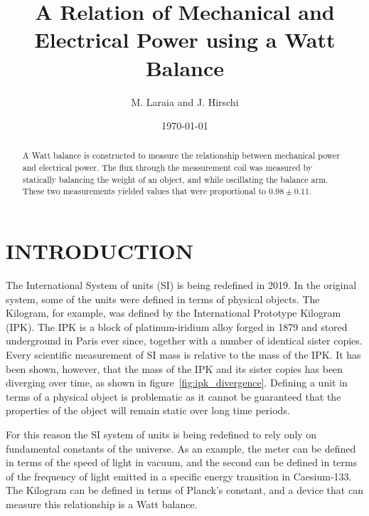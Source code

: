\documentclass[aps,prstab,reprint,12pt]{revtex4-1}
\begin{document}
\title{A Relation of Mechanical and Electrical Power using a Watt Balance}

\author{M. Laraia and J. Hirschi}


\date{\today}

\begin{abstract}
A Watt balance is constructed to measure the relationship between mechanical power and electrical power. The flux through the measurement coil was measured by statically balancing the weight of an object, and while oscillating the balance arm. These two measurements yielded values that were proportional to $0.98 \pm 0.11$.
\end{abstract}

\maketitle

\section{INTRODUCTION}

The International System of units (SI) is being redefined in 2019. In the original system, some of the units were defined in terms of physical objects. The Kilogram, for example, was defined by the International Prototype Kilogram (IPK). The IPK is a block of platinum-iridium alloy forged in 1879 and stored underground in Paris ever since, together with a number of identical sister copies. Every scientific measurement of SI mass is relative to the mass of the IPK. It has been shown, however, that the mass of the IPK and its sister copies has been diverging over time, as shown in figure~\ref{fig:ipk_divergence}. Defining a unit in terms of a physical object is problematic as it cannot be guaranteed that the properties of the object will remain static over long time periods.

For this reason the SI system of units is being redefined to rely only on fundamental constants of the universe. As an example, the meter can be defined in terms of the speed of light in vacuum, and the second can be defined in terms of the frequency of light emitted in a specific energy transition in Caesium-133.
The Kilogram can be defined in terms of Planck's constant, and a device that can measure this relationship is a Watt balance.
\end{document}
